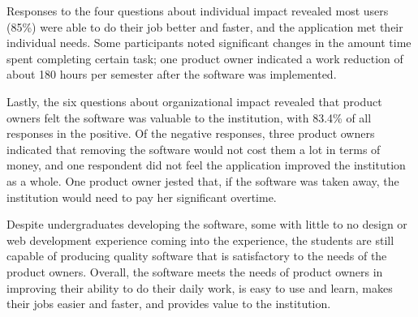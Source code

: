 Responses to the four questions about individual impact revealed most users (85\%) were able to do their job better and faster, and the application met their individual needs. Some participants noted significant changes in the amount time spent completing certain task; one product owner indicated a work reduction of about 180 hours per semester after the software was implemented.


Lastly, the six questions about organizational impact revealed that product owners felt the software was valuable to the institution, with 83.4\% of all responses in the positive. Of the negative responses, three product owners indicated that removing the software would not cost them a lot in terms of money, and one respondent did not feel the application improved the institution as a whole. One product owner jested that, if the software was taken away, the institution would need to pay her significant overtime. 

Despite undergraduates developing the software, some with little to no design or web development experience coming into the experience, the students are still capable of producing quality software that is satisfactory to the needs of the product owners. Overall, the software meets the needs of product owners in improving their ability to do their daily work, is easy to use and learn, makes their jobs easier and faster, and provides value to the institution. 



